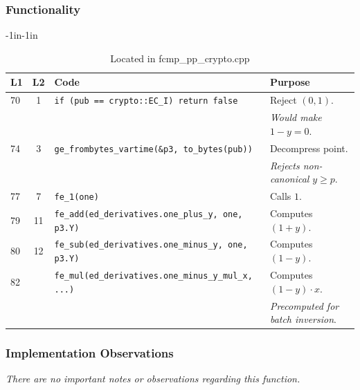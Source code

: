 \documentclass[12pt,titlepage,table]{article}
\begin{document}
\subsubsection{Functionality}


\begin{table}[htbp]
\caption{point\_to\_ed\_derivatives Source To Spec Map}
\begin{adjustwidth}{-1in}{-1in}
\centering
{
\begin{tabular}{| l | c | l | l |}
\hline
\textbf{L1} & \textbf{L2} & \textbf{Code} & \textbf{Purpose} \\
\hline
\hline
70 & 1 & \verb+if (pub == crypto::EC_I) return false+ & Reject $(0,1)$. \\
&&&\textit{Would make} $1-y=0$. \\
74 & 3 & \verb+ge_frombytes_vartime(&p3, to_bytes(pub))+ & Decompress point.\\ &&& \textit{Rejects non-canonical} $y \geq p$.\\
77 & 7 & \verb+fe_1(one)+ &Calls $1$.\\ 
79 & 11 & \verb+fe_add(ed_derivatives.one_plus_y, one, p3.Y)+ & Computes $(1+y)$.  \\
80 &12& \verb+fe_sub(ed_derivatives.one_minus_y, one, p3.Y)+& Computes $(1-y)$. \\
82 & & \verb+fe_mul(ed_derivatives.one_minus_y_mul_x, ...)+ & Computes $(1-y) \cdot x$.\\
&&& \textit{Precomputed for batch inversion}.\\
\hline
\end{tabular}}
\end{adjustwidth}
\caption*{Located in fcmp\_pp\_crypto.cpp}
\end{table}

\newpage
\subsubsection{Implementation Observations}
\textit{There are no important notes or observations regarding this function.}

\end{document}
